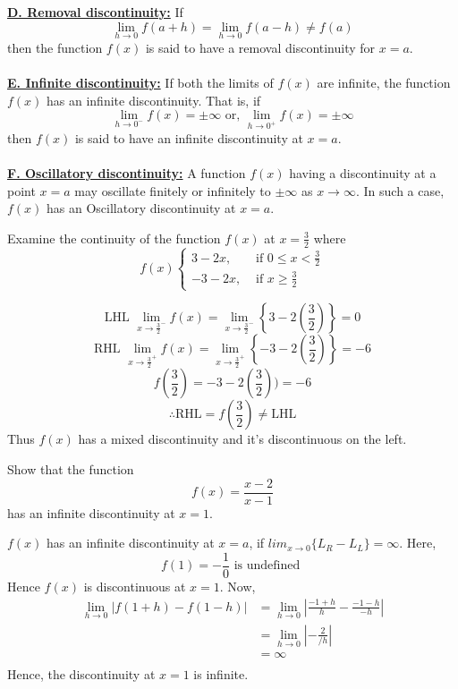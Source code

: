 \underline{\textbf{D. Removal discontinuity:}}
If \[
    \lim_{h \to 0} f(a+h) = \lim_{h \to 0} f(a-h) \neq f(a)
\] then the function $f(x)$ is said to have a removal discontinuity for $x=a$. \\~\\

\underline{\textbf{E. Infinite discontinuity:}}
If both the limits of $f(x)$ are infinite, the function $f(x)$ has an infinite discontinuity. That is, if \[
    \lim_{h \to 0^-} f(x) = \pm \infty \text{ or, } \lim_{h \to 0^+} f(x) = \pm \infty
\] then $f(x)$ is said to have an infinite discontinuity at $x=a$. \\~\\

\underline{\textbf{F. Oscillatory discontinuity:}}
A function $f(x)$ having a discontinuity at a point $x=a$ may oscillate finitely or infinitely to $\pm \infty$ as $x \to \infty$. In such a case, $f(x)$ has an Oscillatory discontinuity at $x=a$.

\begin{example}{Examine the continuity of the function $f(x)$ at $x=\frac{3}{2}$ where 
    \begin{equation*}
        f(x)
        \begin{cases}
            3-2x, &\text{ if } 0 \le x < \frac{3}{2} \\
            -3-2x, & \text{ if } x \ge \frac{3}{2}
        \end{cases}
    \end{equation*}
    }
    
    \[ \text{LHL } \lim_{x \to \frac{3}{2}^-} f(x) = \lim_{x \to \frac{3}{2}^-} \left\{ 3-2 \left( \frac{3}{2} \right) \right\} = 0 \]
    \[ \text{RHL } \lim_{x \to \frac{3}{2}^+} f(x) = \lim_{x \to \frac{3}{2}^+} \left\{ -3-2 \left( \frac{3}{2} \right) \right\} = -6 \]
    \[ f \left( \frac{3}{2} \right) = -3-2 \left( \frac{3}{2} \right)) = -6 \]
    \[ \therefore \text{RHL} = f\left(\frac{3}{2}\right) \neq \text{LHL} \]
    Thus $f(x)$ has a mixed discontinuity and it's discontinuous on the left.
\end{example}

\begin{example}{Show that the function \[
    f(x) = \frac{x-2}{x-1}
\] has an infinite discontinuity at $x=1$.}
    
    $f(x)$ has an infinite discontinuity at $x=a$, if \(lim_{x \to 0} \{ L_R - L_L \} = \infty\). Here,
    \[ f(1) = -\frac{1}{0} \text{ is undefined } \] Hence $f(x)$ is discontinuous at $x=1$. Now,
    \begin{align*}
        \lim_{h \to 0} \left| f(1+h) - f(1-h) \right| &= \lim_{h \to 0} \left| \frac{-1+h}{h} - \frac{-1-h}{-h} \right| \\
        &= \lim_{h \to 0} \left| -\frac{2}{/h} \right| \\
        &= \infty \\
    \end{align*}
    Hence, the discontinuity at $x=1$ is infinite.
\end{example}

